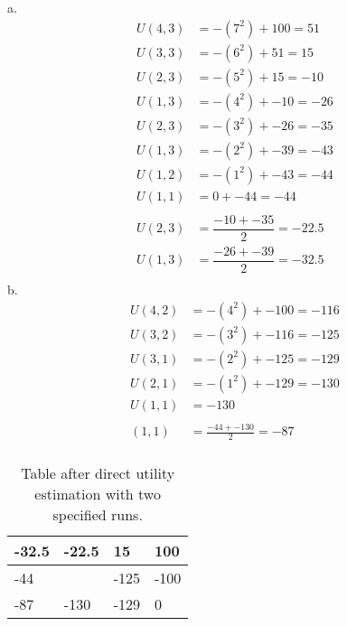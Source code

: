 \documentclass[a4paper]{article}
\begin{document}
a.\\
\begin{align*}
      U(4,3) &= - (7^2) + 100 = 51\\
      U(3,3) &= - (6^2) + 51 = 15\\
      U(2,3) &= - (5^2) + 15 = -10\\
      U(1,3) &= - (4^2) + -10 = -26\\
      U(2,3) &= - (3^2) + -26 = -35\\
      U(1,3) &= - (2^2) + -39 = -43\\
      U(1,2) &= - (1^2) + -43 = -44\\
      U(1,1) &= 0 + -44 = -44\\
      \\
      U(2,3) &= \dfrac{-10 + -35}{2} = -22.5\\
      U(1,3) &= \dfrac{-26 + -39}{2} = -32.5\\
\end{align*}
b.\\
\begin{align*}
      U(4,2) &= -(4^2) + -100 = -116\\
      U(3,2) &= -(3^2) + -116 = -125\\
      U(3,1) &= -(2^2) + -125 = -129\\
      U(2,1) &= -(1^2) + -129 = -130\\
      U(1,1) &= -130\\
      \\
      (1,1) &= \frac{-44 + -130}{2} = -87\\
\end{align*}

\begin{table}[]
  \begin{tabular}{|l|l|l|l|}
  \hline
    -32.5 & -22.5                    & 15   & 100  \\ \hline
    -44   & \cellcolor[HTML]{000000} & -125 & -100 \\ \hline
    -87   & -130                     & -129 & 0 \\ \hline
  \end{tabular}
\caption{Table after direct utility estimation with two specified runs.}
\end{table}
\end{document}
